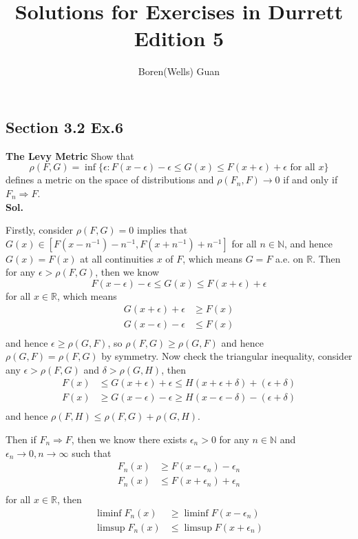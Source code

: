 \documentclass[lang=en,11pt,a4paper,citestyle =authoryear]{elegantpaper}
\title{Solutions for Exercises in Durrett Edition 5}
\author{Boren(Wells) Guan}
\newcommand{\R}{\mathbb{R}}
\newcommand{\N}{\mathbb{N}}
\begin{document}
\maketitle

\subsection*{Section 3.2 Ex.6} 
\textbf{The Levy Metric} Show that
\[\rho(F,G) = \inf \{\epsilon: F(x-\epsilon)-\epsilon \leq G(x) \leq F(x+\epsilon)+\epsilon \text{ for all }x\}\]
defines a metric on the space of distributions and $\rho(F_n,F) \to 0$ if and only if $F_n \Rightarrow F$.
\vspace{0.5em}\\
\textbf{Sol.} \par
Firstly, consider $\rho(F,G) = 0$ implies that $G(x) \in [F(x-n^{-1})-n^{-1},F(x+n^{-1})+n^{-1}]$ for all $n\in\N$, and hence $G(x)=F(x)$ at all continuities $x$ of $F$, which means $G=F$ a.e. on $\R$. Then for any $\epsilon > \rho(F,G)$, then we know
\[F(x-\epsilon)-\epsilon \leq G(x) \leq F(x+\epsilon)+\epsilon\]
for all $x\in\R$, which means
\[\begin{aligned}
    G(x+\epsilon) + \epsilon &\geq F(x) \\
    G(x-\epsilon) - \epsilon &\leq F(x) \\
\end{aligned}\]
and hence $\epsilon \geq \rho(G,F)$, so $\rho(F,G) \geq \rho(G,F)$ and hence $\rho(G,F) = \rho(F,G)$ by symmetry. Now check the triangular inequality, consider any $\epsilon > \rho(F,G)$ and $\delta > \rho(G,H)$, then
\[
\begin{aligned}
    F(x) &\leq G(x+\epsilon) + \epsilon \leq H(x+\epsilon+\delta) +(\epsilon+\delta) \\
    F(x) &\geq G(x-\epsilon) - \epsilon \geq H(x-\epsilon-\delta) - (\epsilon+\delta) \\
\end{aligned}
\]
and hence $\rho(F,H)\leq\rho(F,G)+\rho(G,H)$.\par
Then if $F_n \Rightarrow F$, then we know there exists $\epsilon_n > 0$ for any $n\in\N$ and $\epsilon_n \to 0, n\to\infty$ such that
\[
\begin{aligned}
    F_n(x) &\geq F(x-\epsilon_n)-\epsilon_n \\
    F_n(x) &\leq F(x+\epsilon_n)+\epsilon_n \\
\end{aligned}
\]
for all $x\in \R$, then
\[
\begin{aligned}
    \liminf F_n(x) &\geq \liminf F(x-\epsilon_n) \\
    \limsup F_n(x) &\leq \limsup F(x+\epsilon_n)
\end{aligned}
\]
\end{document}
